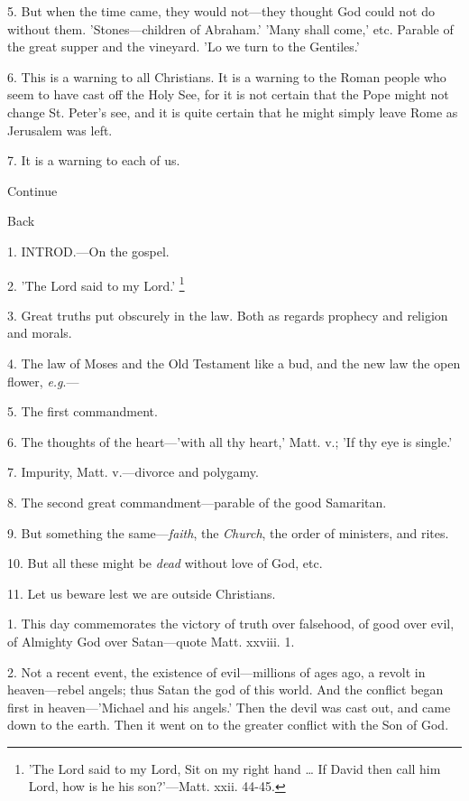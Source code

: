 5. But when the time came, they would not—they
thought God could not do without them. 'Stones—children of Abraham.'
'Many shall come,' etc. Parable of the great supper and the
vineyard. 'Lo we turn to the Gentiles.'

6. This is a warning to all Christians. It is a
warning to the Roman people who seem to have cast off the Holy See,
for it is not certain that the Pope might not change St. Peter's see,
and it is quite certain that he might simply leave Rome as Jerusalem
was left.

7. It is a warning to each of us.

Continue

Back


1. INTROD.—On
the gospel.

2. 'The Lord said to my Lord.' \footnote{'The Lord said to my Lord, Sit on my right
hand … If David then call him Lord, how is he his son?'—Matt. xxii.
44-45.}

3. Great truths put obscurely in the law. Both as
regards prophecy and religion and morals.

4. The law of Moses and the Old Testament like a
bud, and the new law the open flower, \emph{e.g}.—

5. The first commandment.

6. The thoughts of the heart—'with all thy
heart,' Matt. v.; 'If thy eye is single.'

7. Impurity, Matt. v.—divorce and polygamy.

8. The second great commandment—parable of the
good Samaritan.

9. But something the same—\emph{faith}, the \emph{Church},
the order of ministers, and rites.

10. But all these might be \emph{dead} without
love of God, etc.

11. Let us beware lest we are outside Christians.


1. This day commemorates the victory of truth
over falsehood, of good over evil, of Almighty God over Satan—quote
Matt. xxviii. 1.

2. Not a recent event, the existence of
evil—millions of ages ago, a revolt in heaven—rebel angels; thus
Satan the god of this world. And the conflict began first in
heaven—'Michael and his angels.' Then the devil was cast out, and
came down to the earth. Then it went on to the greater conflict with
the Son of God.


